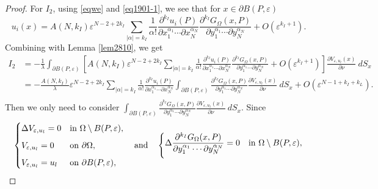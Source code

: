 \documentclass[11pt,reqno]{article}
\numberwithin{equation}{section}
\newcommand\e\varepsilon
\newcommand\la\lambda
\begin{document}
\begin{proof}
          For $I_2$, using \eqref{eqwe} and \eqref{eq1901-1}, we see that for $x\in \partial B(P,\e)$ 
        $$
       u_i(x)= A(N,{ k_I})\e^{N-2+2{ k_I}}	\sum_{|\alpha|={ k_I}}\frac1{\alpha!}
					\frac{\partial^{{ k_I}}u_i(P)}{\partial x_1^{\alpha_1}\cdots\partial x_N^{\alpha_N}}
					\frac{\partial^{{ k_I}}G_{\Omega}(x,P)}{\partial y_1^{\alpha_1}\cdots\partial y_N^{\alpha_N}}+O(\e^{{ k_I}+1}).
        $$
        Combining  with Lemma \ref{lem2810}, we get
        \begin{equation}\label{eq27102025-3}
        \begin{aligned}
            I_2&=-\frac{1}{\la}\int_{\partial B(P,\e)} \left[ A(N,{ k_I})\e^{N-2+2{ k_I}}	\sum_{|\alpha|={ k_I}}\frac1{\alpha!}
					\frac{\partial^{{ k_I}}u_i(P)}{\partial x_1^{\alpha_1}\cdots\partial x_N^{\alpha_N}}
					\frac{\partial^{{ k_I}}G_{\Omega}(x,P)}{\partial y_1^{\alpha_1}\cdots\partial y_N^{\alpha_N}}+O(\e^{{ k_I}+1})\right]\frac{\partial V_{\e,u_l}(x) }{\partial \nu}\ d S_x\\
                    &=-\frac{A(N,{ k_I})}{\la}\e^{N-2+2{k_I}}	\sum_{|\alpha|={ k_I}}\frac1{\alpha!}
					\frac{\partial^{{ k_I}}u_i(P)}{\partial x_1^{\alpha_1}\cdots\partial x_N^{\alpha_N}}\int_{\partial B(P,\e)} \frac{\partial^{{ k_I}}G_{\Omega}(x,P)}{\partial y_1^{\alpha_1}\cdots\partial y_N^{\alpha_N}}\frac{\partial V_{\e,u_l}(x) }{\partial \nu}\ d S_x+O(\e^{N-1+{ k_I}+{ k_L}}).\\
                    \end{aligned}
        \end{equation}
        Then we only need to consider $\int_{\partial B(P,\e)} \frac{\partial^{{ k_I}}G_{\Omega}(x,P)}{\partial y_1^{\alpha_1}\cdots\partial y_N^{\alpha_N}}\frac{\partial V_{\e,u_l}(x) }{\partial \nu}\ d S_x$. Since 
        \begin{equation*}
            \begin{cases}
			\Delta V_{\e,u_l} =0 &\text{in }\Omega\setminus B(P,\e),\vspace{2mm}\\
			V_{\e,u_l} =0 &\text{on }\partial \Omega\vspace{2mm},\\
			V_{\e,u_l} =u_l &\text{on }\partial B(P,\e),
		\end{cases} 
        \quad \text{and}\quad
         \begin{cases}
			\displaystyle \Delta \frac{\partial^{{ k_I}}G_{\Omega}(x,P)}{\partial y_1^{\alpha_1}\cdots\partial y_N^{\alpha_N}} =0 &\text{in }\Omega\setminus B(P,\e),\vspace{2mm}\\

\end{cases}
\end{equation*}
\end{proof}
\end{document}
